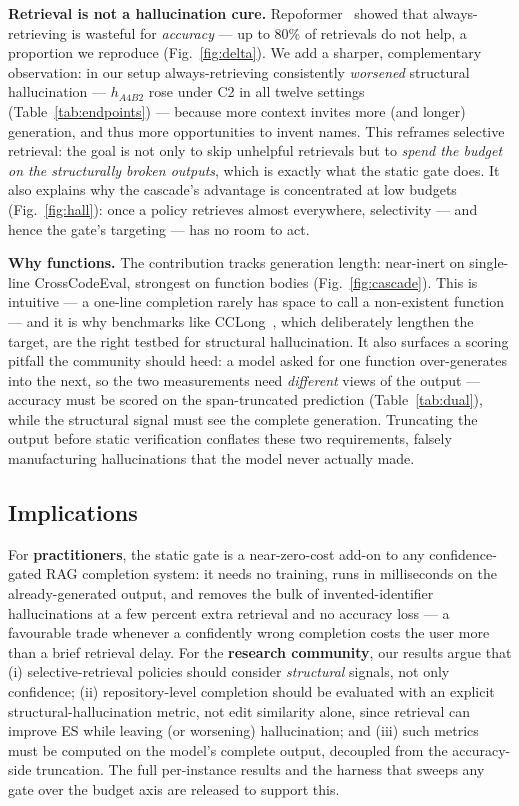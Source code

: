 \documentclass[10pt,conference]{IEEEtran}
\newcommand{\ugr}[1]{{\color{revgreen}#1}}
\begin{document}
\textbf{Retrieval is not a hallucination cure.} Repoformer~\cite{wu2024repoformer}
showed that always-retrieving is wasteful for \emph{accuracy} --- up to 80\% of
retrievals do not help\ugr{, a proportion we reproduce
(Fig.~\ref{fig:delta})}. We add a sharper, complementary observation: \ugr{in
our setup always-retrieving consistently \emph{worsened} structural
hallucination --- $h_{A4B2}$ rose under C2 in all twelve settings
(Table~\ref{tab:endpoints}) ---} because more context invites more (and longer)
generation, and thus more opportunities to invent names. This reframes selective
retrieval: the goal is not only to skip unhelpful retrievals but to \emph{spend the
budget on the structurally broken outputs}, which is exactly what the static gate
does. It also explains why the cascade's advantage is concentrated at low budgets
(Fig.~\ref{fig:hall}): once a policy retrieves almost everywhere, selectivity ---
and hence the gate's targeting --- has no room to act.

\textbf{Why functions.} The contribution tracks generation length: near-inert on
single-line CrossCodeEval, strongest on function bodies (Fig.~\ref{fig:cascade}).
This is intuitive --- a one-line completion rarely has space to call a non-existent
function --- and it is why benchmarks like CCLong~\cite{wu2024repoformer}, which
deliberately lengthen the target, are the right testbed for structural
hallucination. \ugr{It also surfaces a scoring pitfall the community should
heed: a model asked for one function over-generates into the next, so the two
measurements need \emph{different} views of the output --- accuracy must be
scored on the span-truncated prediction (Table~\ref{tab:dual}), while the
structural signal must see the complete generation. Truncating the output
before static verification conflates these two requirements, falsely
manufacturing hallucinations that the model never actually made.}
\subsection{Implications}
For \textbf{practitioners}, the static gate is a near-zero-cost add-on to any
confidence-gated RAG completion system: it needs no training, runs in milliseconds
on the already-generated output, and removes the bulk of invented-identifier
hallucinations at a few percent extra retrieval and no accuracy loss --- \ugr{a
favourable trade whenever a confidently wrong completion costs the user more
than a brief retrieval delay.} For the \textbf{research community}, our results argue
that (i) selective-retrieval policies should consider \emph{structural} signals,
not only confidence; (ii) repository-level completion should be evaluated with an
explicit structural-hallucination metric, not edit similarity alone, since
retrieval can improve ES while leaving (or worsening) hallucination; and (iii) such
metrics must be computed on the model's complete output, decoupled from the
accuracy-side truncation. The full per-instance results and the harness that
sweeps any gate over the budget axis are released to support this.
\end{document}
